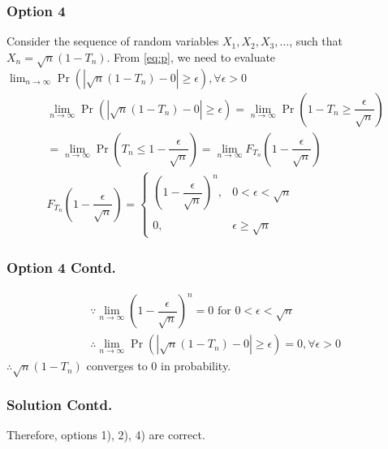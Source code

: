 \documentclass{beamer}
\providecommand{\pr}[1]{\ensuremath{\Pr\left(#1\right)}}
\providecommand{\brak}[1]{\ensuremath{\left(#1\right)}}
\begin{document}
\begin{frame}
\frametitle{Option 4}
Consider the sequence of random variables $X_{1},X_{2},X_{3},\dots$, such that $X_{n}=\sqrt{n}(1-T_{n})$. From \eqref{eq:p}, we need to evaluate $\displaystyle\lim_{n\to\infty}\pr{|\sqrt{n}(1-T_{n})-0|\geq\epsilon},\forall\epsilon>0$
\begin{align}
    &\displaystyle\lim_{n\to\infty}\pr{|\sqrt{n}(1-T_{n})-0|\geq\epsilon}=\displaystyle\lim_{n\to\infty}\pr{1-T_{n}\geq\dfrac{\epsilon}{\sqrt{n}}}\\&=\displaystyle\lim_{n\to\infty}\pr{T_{n}\leq1-\dfrac{\epsilon}{\sqrt{n}}}=\displaystyle\lim_{n\to\infty}F_{T_{n}}\brak{ 1-\dfrac{\epsilon}{\sqrt{n}}}\\
    &F_{T_{n}}\brak{1-\dfrac{\epsilon}{\sqrt{n}}}=\begin{cases}
	\brak{1-\dfrac{\epsilon}{\sqrt{n}}}^{n}, & 0< \epsilon< \sqrt{n}\\~\\[-1em]
	0, & \epsilon\geq \sqrt{n}
	\end{cases}
\end{align}
\end{frame}
    
\begin{frame}
\frametitle{Option 4 Contd.}
\begin{align}
&\because\displaystyle\lim_{n\to\infty}\brak{1-\dfrac{\epsilon}{\sqrt{n}}}^{n}=0 \text{ for } 0< \epsilon<\sqrt{n}\\
    &\therefore \displaystyle\lim_{n\to\infty}\pr{|\sqrt{n}(1-T_{n})-0|\geq\epsilon}=0,\forall\epsilon>0
\end{align}
$\therefore\sqrt{n}(1-T_{n})$ converges to 0 in probability.
\end{frame}

\begin{frame}
\frametitle{Solution Contd.}
Therefore, options 1), 2), 4) are correct.
\end{frame}
\end{document}
